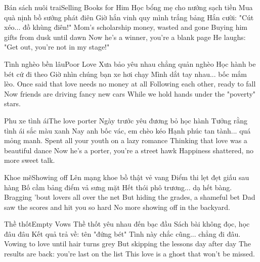 \begin{tutuyetbox}{Bán sách nuôi trai}{Selling Books for Him}
Học bổng mẹ cho nướng sạch tiền
Mua quà nịnh bồ sướng phát điên
Giờ hắn vinh quy mình trắng bảng
Hắn cười: "Cút xéo... đồ khùng điên!"
\tcblower
Mom's scholarship money, wasted and gone
Buying him gifts from dusk until dawn
Now he's a winner, you're a blank page
He laughs: "Get out, you're not in my stage!"
\end{tutuyetbox}

\begin{tutuyetbox}{Tình nghèo bền lâu}{Poor Love}
Xưa bảo yêu nhau chẳng quản nghèo
Học hành be bét cứ đi theo
Giờ nhìn chúng bạn xe hơi chạy
Mình dắt tay nhau... bốc mắm lèo.
\tcblower
Once said that love needs no money at all
Following each other, ready to fall
Now friends are driving fancy new cars
While we hold hands under the "poverty" stars.
\end{tutuyetbox}

\begin{tutuyetbox}{Phu xe tình ái}{The love porter}
Ngày trước yêu đương bỏ học hành
Tưởng rằng tình ái sắc màu xanh
Nay anh bốc vác, em chèo kéo
Hạnh phúc tan tành... quá mỏng manh.
\tcblower
Spent all your youth on a lazy romance
Thinking that love was a beautiful dance
Now he's a porter, you're a street hawk
Happiness shattered, no more sweet talk.
\end{tutuyetbox}

\begin{tutuyetbox}{Khoe mẽ}{Showing off}
Lên mạng khoe bồ thật vẻ vang
Điểm thi lẹt đẹt giấu sau hàng
Bố cầm bảng điểm vả sưng mặt
Hết thói phô trương... dạ hết bàng.
\tcblower
Bragging 'bout lovers all over the net
But hiding the grades, a shameful bet
Dad saw the scores and hit you so hard
No more showing off in the backyard.
\end{tutuyetbox}

\begin{tutuyetbox}{Thề thốt}{Empty Vows}
Thề thốt yêu nhau đến bạc đầu
Sách bài không đọc, học đâu đâu
Kết quả trả về: tên "đứng bét"
Tình này chắc cũng... chẳng đi đâu.
\tcblower
Vowing to love until hair turns grey
But skipping the lessons day after day
The results are back: you're last on the list
This love is a ghost that won't be missed.
\end{tutuyetbox}

